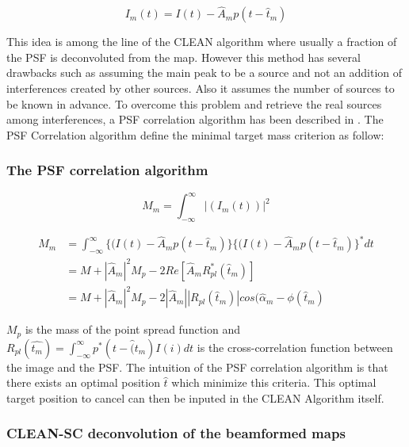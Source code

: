 \begin{equation}
    I_{m}(t)=I(t)-\hat{A}_{m}p(t-\hat{t}_{m})
\end{equation}

This idea is among the line of the CLEAN algorithm where usually a fraction of the PSF is deconvoluted from the map. However this method has several drawbacks such as assuming the main peak to be a source and not an addition of interferences created by other sources. Also it assumes the number of sources to be known in advance. To overcome this problem and retrieve the real sources among interferences, a PSF correlation algorithm has been described in \cite{freedman1995techniques}. The PSF Correlation algorithm define the minimal target mass criterion as follow:

\subsubsection{The PSF correlation algorithm}

    \begin{equation}
        M_{m}=\int_{-\infty}^{\infty}|{(I_{m}(t))}|^2
    \end{equation}
    
    \begin{equation}
        \begin{split}
        M_{m} & =\int_{-\infty}^{\infty}\{{(I(t)-\hat{A}_{m}p(t-\hat{t}_{m})}\}\{{(I(t)-\hat{A}_{m}p(t-\hat{t}_{m})}\}^*dt \\
              & = M + |{\hat{A}_{m}}|^2M_{p}-2Re[{\hat{A}_{m}}{R^*_{pl}(\hat{t}_{m})}]\\
              & = M + |{\hat{A}_{m}}|^2M_{p}-2|{\hat{A}_{m}}||{R_{pl}(\hat{t}_{m})}|cos(\hat{\alpha}_{m}-\phi(\hat{t}_{m})
        \end{split}
    \end{equation}

$M_{p}$ is the mass of the point spread function and $R_{pl}(\hat{t_{m}})=\int_{-\infty}^{\infty}{p^{*}(t-\hat(t_{m})I(i)dt}$ is the cross-correlation function between the image and the PSF.
The intuition of the PSF correlation algorithm is that there exists an optimal position $\hat{t}$ which minimize this criteria. This optimal target position to cancel can then be inputed in the CLEAN Algorithm itself.\\

\subsubsection{CLEAN-SC deconvolution of the beamformed maps}

